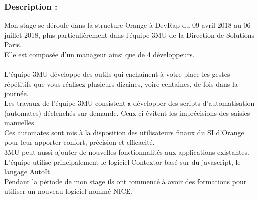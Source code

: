 \documentclass[a4paper,twoside,12pt,openright]{report}
\begin{document}
\subsubsection{Description :}
Mon stage se déroule dans la structure Orange à DevRap du 09 avril 2018 au 06 juillet 2018, plus particulièrement dans l’équipe 3MU de la Direction de Solutions Paris.\\
Elle est composée d’un manageur ainsi que de 4 développeurs.\\\\
L’équipe 3MU développe des outils qui enchaînent à votre place les gestes répétitifs que vous réalisez plusieurs dizaines, voire centaines, de fois dans la journée.\\
Les travaux de l’équipe 3MU consistent à développer des scripts d’automatisation (automates) déclenchés sur demande. Ceux-ci évitent les imprécisions des saisies manuelles.\\
Ces automates sont mis à la disposition des utilisateurs finaux du SI d’Orange pour leur apporter confort, précision et efficacité.\\
3MU peut aussi ajouter de nouvelles fonctionnalités aux applications existantes.\\
L’équipe utilise principalement le logiciel Contextor basé sur du javascript, le langage AutoIt.\\
Pendant la période de mon stage ils ont commencé à avoir des formations pour utiliser un nouveau logiciel nommé NICE.\\
\end{document}
